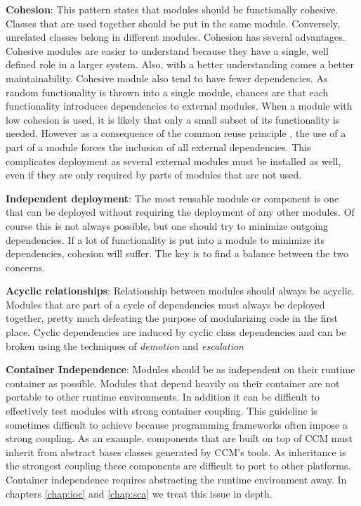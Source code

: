 \textbf{Cohesion}:
This pattern states that modules should be functionally cohesive. Classes that are used together should
be put in the same module. Conversely, unrelated classes belong in different modules. Cohesion has several
advantages. Cohesive modules are easier to understand because they have a single, well defined role in a
larger system. Also, with a better understanding comes a better maintainability. Cohesive module also tend
to have fewer dependencies. As random functionality is thrown into a single module, chances are that each
functionality introduces dependencies to external modules. When a module with low cohesion is used, it is
likely that only a small subset of its functionality is needed. However as a consequence of the common reuse
principle \cite{Martin}, the use of a part of a module forces the inclusion of all external dependencies.
This complicates deployment as several external modules must be installed as well, even if they are only
required by parts of modules that are not used.

\textbf{Independent deployment}:
The most reusable module or component is one that can be deployed without requiring the deployment of any other
modules. Of course this is not always possible, but one should try to minimize outgoing dependencies.
If a lot of functionality is put into a module to minimize its dependencies, cohesion will suffer.
The key is to find a balance between the two concerns.

\textbf{Acyclic relationships}:
Relationship between modules should always be acyclic. Modules that are part of a cycle of dependencies
must always be deployed together, pretty much defeating the purpose of modularizing code in the first place.
Cyclic dependencies are induced by cyclic class dependencies and can be broken using the techniques of
\emph{demotion} and \emph{escalation} \cite{Lakos}

\textbf{Container Independence}:
Modules should be as independent on their runtime container as possible. Modules that depend heavily on their
container are not portable to other runtime environments. In addition it can be difficult to effectively
test modules with strong container coupling. This guideline is sometimes difficult to achieve because
programming frameworks often impose a strong coupling. As an example, components that are built on top
of CCM must inherit from abstract bases classes generated by CCM's tools. As inheritance is the strongest coupling
these components are difficult to port to other platforms. Container independence requires abstracting the
runtime environment away. In chapters \ref{chap:ioc} and \ref{chap:sca} we treat this issue in depth.

